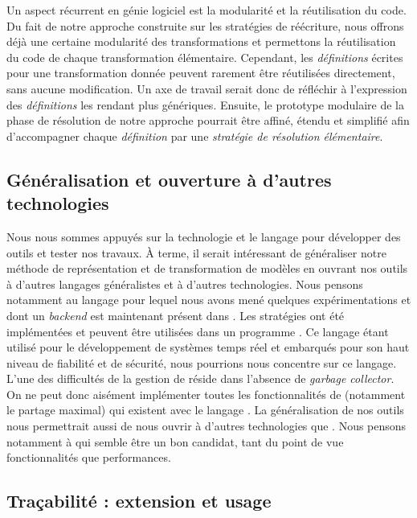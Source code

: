 Un aspect récurrent en génie logiciel est la modularité et la réutilisation du
code. Du fait de notre approche construite sur les stratégies de réécriture,
nous offrons déjà une certaine modularité des transformations et permettons la
réutilisation du code de chaque transformation élémentaire. Cependant, les
\emph{définitions} écrites pour une transformation donnée peuvent rarement être
réutilisées directement, sans aucune modification. Un axe de travail serait
donc de réfléchir à l'expression des \emph{définitions} les rendant plus
génériques. Ensuite, le prototype modulaire de la phase de résolution de notre
approche pourrait être affiné, étendu et simplifié afin d'accompagner chaque
\emph{définition} par une \emph{stratégie de résolution élémentaire}.

\subsection*{Généralisation et ouverture à d'autres technologies}

Nous nous sommes appuyés sur la technologie {\emf} et le langage {\java} pour
développer des outils et tester nos travaux. À terme, il serait intéressant de
généraliser notre méthode de représentation et de transformation de modèles en
ouvrant nos outils à d'autres langages généralistes et à d'autres technologies.
Nous pensons notamment au langage {\ada} pour lequel nous avons mené quelques
expérimentations et dont un \emph{backend} est maintenant présent dans {\tom}.
Les stratégies ont été implémentées et peuvent être utilisées dans un programme
{\ada}. Ce langage étant utilisé pour le développement de systèmes temps réel
et embarqués pour son haut niveau de fiabilité et de sécurité, nous pourrions
nous concentre sur ce langage. L'une des difficultés de la gestion de {\ada}
réside dans l'absence de \emph{garbage collector}. On ne peut donc aisément
implémenter toutes les fonctionnalités de {\tom} (notamment le partage maximal)
qui existent avec le langage {\java}. La généralisation de nos outils nous
permettrait aussi de nous ouvrir à d'autres technologies que {\emf}. Nous
pensons notamment à {\kevoree} qui semble être un bon candidat, tant du point
de vue fonctionnalités que performances.



\subsection*{Traçabilité : extension et usage}

